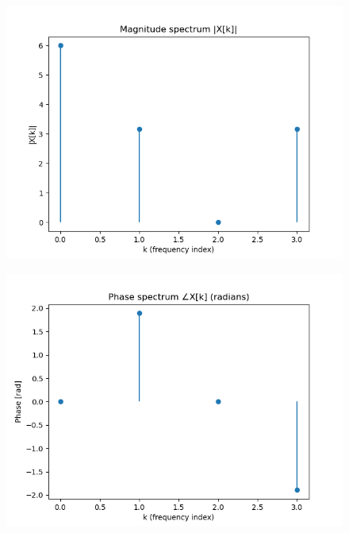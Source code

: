 \documentclass[12pt]{article}
\begin{document}
\begin{figure}[H]
    \centering
    \includegraphics[width=0.7\columnwidth]{figs/fig4.png}
    \caption{}
    \label{fig:placeholder}
\end{figure}

\begin{figure}[H]
    \centering
    \includegraphics[width=0.7\columnwidth]{figs/fig5.png}
    \caption{}
    \label{fig:placeholder}
\end{figure}
\end{document}
